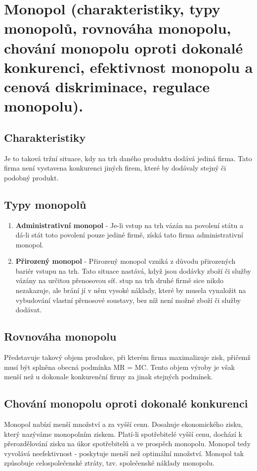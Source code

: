 \clearpage
\section{Monopol (charakteristiky, typy monopolů, rovnováha monopolu, chování monopolu
oproti dokonalé konkurenci, efektivnost monopolu a cenová diskriminace, regulace
monopolu).}

\subsection{Charakteristiky}
Je to taková tržní situace, kdy na trh daného produktu dodává jediná firma. Tato
firma není vystavena konkurenci jiných firem, které by dodávaly stejný či podobný produkt.

\subsection{Typy monopolů}
\begin{enumerate}
    \item \textbf{Administrativní monopol} - Je-li vstup na trh vázán na povolení státu a dá-li stát 
    toto povolení pouze jediné firmě, získá tato firma administrativní monopol.
    \item \textbf{Přirozený monopol} - Přirozený monopol vzniká z důvodu přirozených bariér vstupu na trh.
    Tato situace nastává, když jsou dodávky zboží či služby vázány na určitou přenosovou síť. 
    stup na trh druhé firmě sice nikdo nezakazuje, ale brání jí v něm vysoké náklady, které by 
    musela vynaložit na vybudování vlastní přenosové soustavy, bez níž není možné zboží či služby dodávat.
\end{enumerate}

\subsection{Rovnováha monopolu}
Představuje takový objem produkce, při kterém firma maximalizuje zisk, přičemž musí být splněna
obecná podmínka MR = MC. Tento objem výroby je však menší než u dokonale konkurenční firmy 
za jinak stejných podmínek.

\subsection{Chování monopolu oproti dokonalé konkurenci}
Monopol nabízí menší množství a za vyšší cenu. Dosahuje ekonomického zisku, který nazýváme
monopolním ziskem. Platí-li spotřebitelé vyšší cenu, dochází k přerozdělování zisku na úkor 
spotřebitelů a ve prospěch monopolu. Monopol tedy vyvolává neefektivnost - poskytuje menší 
než optimální množství. Monopol tak způsobuje celospolečenské ztráty, tzv. společenské náklady monopolu.

